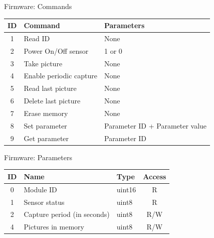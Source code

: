 
\begin{frame}{Firmware: Commands}

\begin{table}[!htb]
    \centering
    \label{tab:commands}
    \begin{tabular}{cll}
        \toprule[1.5pt]
        \textbf{ID} & \textbf{Command} & \textbf{Parameters}\\
        \midrule
        1 & Read ID                 & None \\
        2 & Power On/Off sensor     & 1 or 0 \\
        3 & Take picture            & None \\
        4 & Enable periodic capture & None \\
        5 & Read last picture       & None \\
        6 & Delete last picture     & None \\
        7 & Erase memory            & None \\
        8 & Set parameter           & Parameter ID + Parameter value \\
        9 & Get parameter           & Parameter ID \\
        \bottomrule[1.5pt]
    \end{tabular}
\end{table}

\end{frame}

\begin{frame}{Firmware: Parameters}

\begin{table}[!htb]
    \centering
    \label{tab:parameters}
    \begin{tabular}{cllc}
        \toprule[1.5pt]
        \textbf{ID} & \textbf{Name} & \textbf{Type} & \textbf{Access} \\
        \midrule
        0 & Module ID                   & uint16 & R\\
        1 & Sensor status               & uint8  & R  \\
        2 & Capture period (in seconds) & uint8  & R/W \\
        4 & Pictures in memory          & uint8  & R/W \\
        \bottomrule[1.5pt]
    \end{tabular}
\end{table}

\end{frame}

